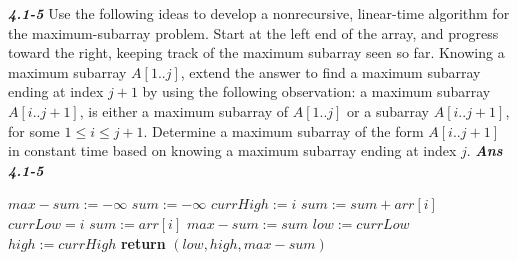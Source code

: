 \documentclass[a4paper]{article}
\begin{document}
\textit{\textbf{4.1-5}} Use the following ideas to develop a nonrecursive, linear-time algorithm for the maximum-subarray problem. Start at the left end of the array, and progress toward the right, keeping track of the maximum subarray seen so far. Knowing a maximum subarray $A[1..j]$, extend the answer to find a maximum subarray ending at index $j + 1$ by using the following observation: a maximum subarray $A[i..j + 1]$, is either a maximum subarray of $A[1..j]$ or a subarray $A[i..j + 1]$, for some $1 \le i \le j + 1$. Determine a maximum subarray of the form $A[i..j + 1]$ in constant time based on knowing a maximum subarray ending at index $j$.
\textit{\textbf{Ans 4.1-5}} \\
\begin{algorithm}
\caption{ITERATIVE-MAX-SUBARRAY}
\begin{algorithmic}[1]
	\State $max-sum := -\infty$
	\State $sum := -\infty$
		\State $currHigh := i$
			\State $sum := sum + arr[i]$
		\Else
			\State $currLow = i$
			\State $sum := arr[i]$
		\EndIf
			\State $max-sum := sum$
			\State $low := currLow$
			\State $high := currHigh$
		\EndIf
	\EndFor
	\State \textbf{return} $\left( low, high, max-sum\right)$
\EndProcedure
\end{algorithmic}
\end{algorithm}
\end{document}
